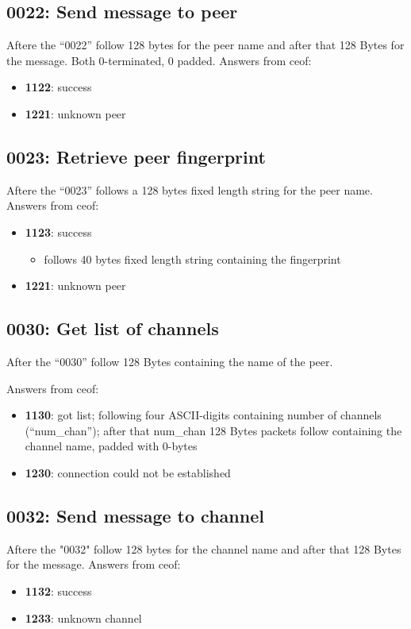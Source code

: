\documentclass[12pt,a4paper]{book}
\begin{document}
\subsection{0022: Send message to peer}
Aftere the "`0022"' follow 128 bytes for the peer name
and after that 128 Bytes for the message.
Both 0-terminated, 0 padded.
Answers from ceof:
\begin{itemize}
\item \textbf{1122}: success
\item \textbf{1221}: unknown peer
\end{itemize}
\subsection{0023: Retrieve peer fingerprint}
Aftere the "`0023"' follows a 128 bytes fixed length string for the peer name.
Answers from ceof:
\begin{itemize}
\item \textbf{1123}: success
\begin{itemize}
\item follows 40 bytes fixed length string containing the fingerprint
\end{itemize}
\item \textbf{1221}: unknown peer
\end{itemize}
\subsection{0030: Get list of channels}
After the "`0030"' follow 128 Bytes containing the 
name of the peer.

Answers from ceof:

\begin{itemize}
\item \textbf{1130}: got list; following four ASCII-digits containing
number of channels ("`num\_chan"'); after that  num\_chan 128 Bytes packets
follow containing the channel name, padded with 0-bytes
\item \textbf{1230}: connection could not be established
\end{itemize}
\subsection{0032: Send message to channel}
Aftere the "0032" follow 128 bytes for the channel name and after
that 128 Bytes for the message.
Answers from ceof:
\begin{itemize}
\item \textbf{1132}: success
\item \textbf{1233}: unknown channel
\end{itemize}
\end{document}
